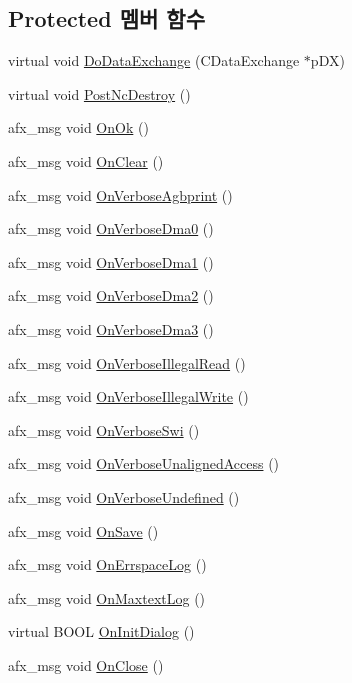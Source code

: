 \subsection*{Protected 멤버 함수}
\begin{DoxyCompactItemize}
\item 
virtual void \mbox{\hyperlink{class_logging_acae1b2006158246fdb01652ef474b35e}{Do\+Data\+Exchange}} (C\+Data\+Exchange $\ast$p\+DX)
\item 
virtual void \mbox{\hyperlink{class_logging_ab1765bcb53cd404f0e511f5a20e05f78}{Post\+Nc\+Destroy}} ()
\item 
afx\+\_\+msg void \mbox{\hyperlink{class_logging_a65ef606af9b874a580b1845405414e3d}{On\+Ok}} ()
\item 
afx\+\_\+msg void \mbox{\hyperlink{class_logging_a3f790eea70e4747a0279fab3ccc4de33}{On\+Clear}} ()
\item 
afx\+\_\+msg void \mbox{\hyperlink{class_logging_a2753a791376fbbf7afc759eda3c5f797}{On\+Verbose\+Agbprint}} ()
\item 
afx\+\_\+msg void \mbox{\hyperlink{class_logging_a0b84d239efc2e8bb496a315804a41553}{On\+Verbose\+Dma0}} ()
\item 
afx\+\_\+msg void \mbox{\hyperlink{class_logging_af1b9e807abdf717e20bf3cb7a3a39099}{On\+Verbose\+Dma1}} ()
\item 
afx\+\_\+msg void \mbox{\hyperlink{class_logging_a5976754962789093961701eeeca3e0a9}{On\+Verbose\+Dma2}} ()
\item 
afx\+\_\+msg void \mbox{\hyperlink{class_logging_acbb2488ba65d526996806d3a4156bac9}{On\+Verbose\+Dma3}} ()
\item 
afx\+\_\+msg void \mbox{\hyperlink{class_logging_a33d7f61c6216cb3cff88fd4e1e614087}{On\+Verbose\+Illegal\+Read}} ()
\item 
afx\+\_\+msg void \mbox{\hyperlink{class_logging_a16b403f45f3ac4191d65a09ed76b71ea}{On\+Verbose\+Illegal\+Write}} ()
\item 
afx\+\_\+msg void \mbox{\hyperlink{class_logging_a259d3e7d18156282e39c7f8594c03c92}{On\+Verbose\+Swi}} ()
\item 
afx\+\_\+msg void \mbox{\hyperlink{class_logging_ab6beb507c8821168ba87abc732eb6ca1}{On\+Verbose\+Unaligned\+Access}} ()
\item 
afx\+\_\+msg void \mbox{\hyperlink{class_logging_a7b4d1fd1026a4b1746f83847b0aee17e}{On\+Verbose\+Undefined}} ()
\item 
afx\+\_\+msg void \mbox{\hyperlink{class_logging_ae00d039caa8724e18442bb7beaf8457c}{On\+Save}} ()
\item 
afx\+\_\+msg void \mbox{\hyperlink{class_logging_afe62d9f99dd8178d053c88adb90fc120}{On\+Errspace\+Log}} ()
\item 
afx\+\_\+msg void \mbox{\hyperlink{class_logging_a4d292fcd815e0ea21894c4ff08b4a4f8}{On\+Maxtext\+Log}} ()
\item 
virtual B\+O\+OL \mbox{\hyperlink{class_logging_a5a0a6200a3d55702597a73f7fe8794f5}{On\+Init\+Dialog}} ()
\item 
afx\+\_\+msg void \mbox{\hyperlink{class_logging_a25fa65fba20c90cf095583abc29318e7}{On\+Close}} ()
\end{DoxyCompactItemize}


